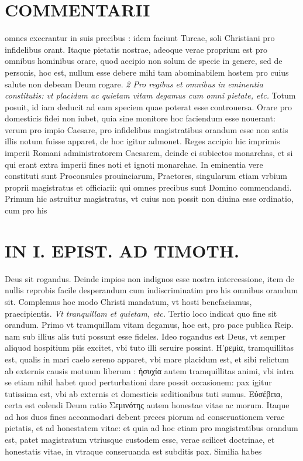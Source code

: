 \documentclass{article}
\begin{document}
\begin{pages}
\section*{COMMENTARII }
\marginpar{[ p.46 ]}\pstart omnes execrantur in suis precibus : idem faciunt Turcae, soli Christiani pro infidelibus orant. Itaque pietatis nostrae, adeoque verae proprium est pro omnibus hominibus orare, quod accipio non solum de specie in genere, sed de personis, hoc est, nullum esse debere mihi tam abominabilem hostem pro cuius salute non debeam Deum rogare.  \pend
\textit{2 Pro regibus et omnibus in eminentia constitutis: vt placidam ac quietam vitam degamus cum omni pietate, etc. }\pstart Totum posuit, id iam deducit ad eam speciem quae poterat esse controuersa. Orare pro domesticis fidei non iubet, quia sine monitore hoc faciendum esse nouerant: verum pro impio Caesare, pro infidelibus magistratibus orandum esse non satis illis notum fuisse apparet, de hoc igitur admonet. Reges accipio hic imprimis imperii Romani administratorem Caesarem, deinde ei subiectos monarchas, et si qui erant extra imperii fines noti et ignoti monarchae. In eminentia vere constituti sunt Proconsules prouinciarum, Praetores, singularum etiam vrbium proprii magistratus et officiarii: qui omnes precibus sunt Domino commendandi. Primum hic astruitur magistratus, vt cuius non possit non diuina esse ordinatio, cum pro his  \pend
\section*{IN I. EPIST. AD TIMOTH. }
\marginpar{[ p.47 ]}\pstart Deus sit rogandus. Deinde impios non indignos esse nostra intercessione, item de nullis reprobis facile desperandum cum indiscriminatim pro his omnibus orandum sit. Complemus hoc modo Christi mandatum, vt hosti benefaciamus, praecipientis.  \pend
\textit{Vt tranquillam et quietam, etc. }\pstart Tertio loco indicat quo fine sit orandum. Primo vt tramquillam vitam degamus, hoc est, pro pace publica Reip. nam sub illius alis tuti possunt esse fideles. Ideo rogandus est Deus, vt semper aliquod hospitium piis excitet, vbi tuto illi seruire possint. H'ρεμία, tramquillitas est, qualis in mari caelo sereno apparet, vbi mare placidum est, et sibi relictum ab externis causis motuum liberum : ἠσυχία autem tramquillitas animi, vbi intra se etiam nihil habet quod perturbationi dare possit occasionem: pax igitur tutissima est, vbi ab externis et domesticis seditionibus tuti sumus. Εὐσέβεια, certa est colendi Deum ratio Σεμινότης autem honestae vitae ac morum. Itaque ad hos duos fines acconmodari debent preces piorum ad conseruationem verae pietatis, et ad honestatem vitae: et quia ad hoc etiam pro magistratibus orandum est, patet magistratum vtriusque custodem esse, verae scilicet doctrinae, et honestatis vitae, in vtraque conseruanda est subditis pax. Similia habes  \pend

\end{pages}
\end{document}
